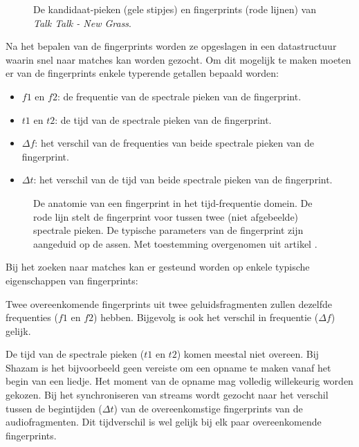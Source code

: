 \begin{figure}[h!]
	\captionsetup{width=0.7\textwidth}
	\caption[Kandidaat-pieken en fingerprints]{De kandidaat-pieken (gele stipjes) en fingerprints (rode lijnen)  van \textit{Talk Talk - New Grass}.}
	\begin{center}
		\advance\parskip0.3cm
		
	\end{center}
\end{figure}

Na het bepalen van de fingerprints worden ze opgeslagen in een datastructuur waarin snel naar matches kan worden gezocht.
Om dit mogelijk te maken moeten er van de fingerprints enkele typerende getallen bepaald worden:

\begin{itemize}[noitemsep]
	\item $ f1 $ en $ f2 $: de frequentie van de spectrale pieken van de fingerprint.
	\item $ t1 $ en $ t2 $: de tijd van de spectrale pieken van de fingerprint.
	\item $ \Delta f $: het verschil van de frequenties van beide spectrale pieken van de fingerprint.
	\item $ \Delta t $: het verschil van de tijd van beide spectrale pieken van de fingerprint.
\end{itemize}

\begin{figure}[h]
	\captionsetup{width=0.7\textwidth}
	\caption[De anatomie van een fingerprint]{De anatomie van een fingerprint in het tijd-frequentie domein. De rode lijn stelt de fingerprint voor tussen twee (niet afgebeelde) spectrale pieken. De typische parameters van de fingerprint zijn aangeduid op de assen. Met toestemming overgenomen uit artikel \cite{six2015multimodal}.}
	\begin{center}
		\advance\parskip0.3cm
		
	\end{center}
\end{figure}

Bij het zoeken naar matches kan er gesteund worden op enkele typische eigenschappen van fingerprints: 

Twee overeenkomende fingerprints uit twee geluidsfragmenten zullen dezelfde frequenties  ($f1$ en $f2$) hebben. Bijgevolg is ook het verschil in frequentie ($\Delta f$) gelijk. 

De tijd van de spectrale pieken ($t1$ en $t2$) komen meestal niet overeen. Bij Shazam is het bijvoorbeeld geen vereiste om een opname te maken vanaf het begin van een liedje. Het moment van de opname mag volledig willekeurig worden gekozen. Bij het synchroniseren van streams wordt gezocht naar het verschil tussen de begintijden ($\Delta t$) van de overeenkomstige fingerprints van de audiofragmenten. Dit tijdverschil is wel gelijk bij elk paar overeenkomende fingerprints.

